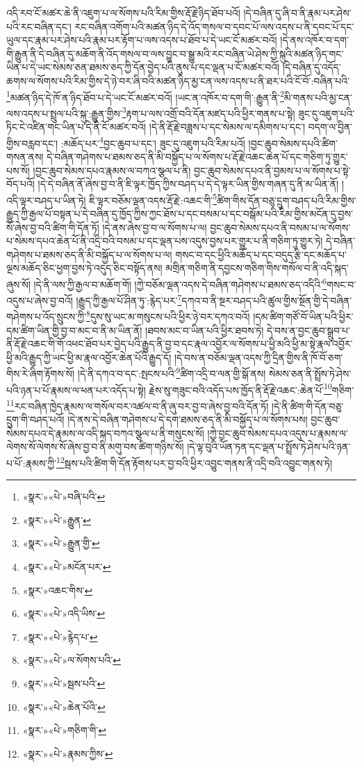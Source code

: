 འདི་རབ་ངོ་མཚར་ཆེ་ནི་འཇུག་པ་ལ་སོགས་པའི་རིམ་གྱིས་རྡོ་རྗེ་ཉིད་ཐོབ་པའོ། །དེ་བཞིན་དུ་ཞི་བ་ནི་རྣམ་པར་ཤེས་པའི་རང་བཞིན་དང་། རང་བཞིན་འགོག་པའི་མཚན་ཉིད་དེ་འོད་གསལ་བ་དབང་པོ་ལས་འདས་པ་ནི་དབང་པོ་དང་ཡུལ་དང་རྣམ་པར་ཤེས་པའི་རྣམ་པར་རྟོག་པ་ལས་འདས་པ་ཐོབ་པ་དེ་ཡང་ངོ་མཚར་བའོ། །དེ་ནས་འཁོར་བ་དག་གི་རྒྱུན་ནི་དེ་བཞིན་དུ་མཆོག་ནི་འོད་གསལ་བ་ལས་བྱུང་བ་སྒྱུ་མའི་རང་བཞིན་ཡེ་ཤེས་ཀྱི་སྐུའི་མཚན་ཉིད་གང་ཡིན་པ་དེ་ཡང་སེམས་ཅན་ཐམས་ཅད་ཀྱི་དོན་བྱེད་པའི་ནུས་པ་དང་ལྡན་པ་ངོ་མཚར་བའོ། །དེ་བཞིན་དུ་འདོད་ཆགས་ལ་སོགས་པའི་རིམ་གྱིས་དེ་ཉེ་བར་ཞི་བའི་མཚན་ཉིད་མྱ་ངན་ལས་འདས་པ་ནི་ཐར་པའི་ངོ་བོ་:བཞིན་པའི་\footnote{«སྣར་»«པེ་»བཞི་པའི་}མཚན་ཉིད་དེ་ཁོ་ན་ཉིད་ཐོབ་པ་དེ་ཡང་ངོ་མཚར་བའོ། །ཡང་ན་འཁོར་བ་དག་གི་:རྒྱུན་ནི་\footnote{«སྣར་»«པེ་»རྒྱུན་}མི་གནས་པའི་མྱ་ངན་ལས་འདས་པ་སྤྲུལ་པའི་སྐུ་:རྒྱུན་གྱིས་\footnote{«སྣར་»«པེ་»རྒྱུན་གྱི་}རྟག་པ་ལས་འགྲོ་བའི་དོན་མཛད་པའི་ཕྱིར་གནས་པ་སྟེ། ཟུང་དུ་འཇུག་པའི་ཏིང་ངེ་འཛིན་གང་ཡིན་པ་དེ་ནི་ངོ་མཚར་བའོ། །དེ་ནི་རྡོ་རྗེ་བཟླས་པ་དང་སེམས་ལ་དམིགས་པ་དང་། བདག་ལ་བྱིན་གྱིས་བརླབ་དང་། :མཆོད་པར་\footnote{«སྣར་»«པེ་»མངོན་པར་}བྱང་ཆུབ་པ་དང་། ཟུང་དུ་འཇུག་པའི་རིམ་པའོ། །བྱང་ཆུབ་སེམས་དཔའི་ཚིག་གསན་ནས། དེ་བཞིན་གཤེགས་པ་ཐམས་ཅད་ནི་མི་བསྐྱོད་པ་ལ་སོགས་པ་རྡོ་རྗེ་འཆང་ཆེན་པོ་དང་གཅིག་ཏུ་གྱུར་པས་སོ། །བྱང་ཆུབ་སེམས་དཔའ་རྣམས་ལ་བཀའ་སྩལ་པ་ནི། བྱང་ཆུབ་སེམས་དཔའ་ནི་བྱམས་པ་ལ་སོགས་པ་སྟེ་བོད་པའོ། །དེ་དེ་བཞིན་ནོ་ཞེས་བྱ་བ་ནི་ཇི་ལྟར་ཁྱོད་ཀྱིས་བཤད་པ་དེ་དེ་ལྟར་ཡིན་གྱིས་གཞན་དུ་ནི་མ་ཡིན་ནོ། །འདི་ལྟར་བཤད་པ་ཡིན་ཏེ། ཇི་ལྟར་བཅོམ་ལྡན་འདས་རྡོ་རྗེ་:འཆང་གི་\footnote{«སྣར་»འཆང་གིས་}ཚིག་གིས་དོན་བཅུ་དྲུག་བཤད་པའི་རིམ་གྱིས་རྒྱུད་ཀྱི་རྒྱལ་པོ་བསྟན་པ་དེ་བཞིན་དུ་ཁྱོད་ཀྱིས་ཀྱང་ཐོས་པ་དང་བསམ་པ་དང་བསྒོམ་པའི་རིམ་གྱིས་མངོན་དུ་བྱས་སོ་ཞེས་བྱ་བའི་ཚིག་གི་དོན་ཏོ། །དེ་ནས་ཞེས་བྱ་བ་ལ་སོགས་པ་ལ། བྱང་ཆུབ་སེམས་དཔའ་ནི་བསམ་པ་ལ་སོགས་པ་སེམས་དཔའ་ཆེན་པོ་ནི་འདྲི་བའི་བསམ་པ་དང་ལྡན་པས་འདུས་བྱས་པར་གྱུར་པ་ནི་གཅིག་ཏུ་གྱུར་ཏེ། དེ་བཞིན་གཤེགས་པ་ཐམས་ཅད་ནི་མི་བསྐྱོད་པ་ལ་སོགས་པ་ལ། གསང་བ་དང་ཕྱིའི་མཆོད་པ་དང་བདུད་རྩི་དང་མཆོད་པ་ལྔས་མཆོད་ཅིང་ཕྱག་བྱས་ཏེ་འདུད་ཅིང་བསྟོད་ནས། མགྲིན་གཅིག་ནི་དབྱངས་གཅིག་གིས་གསོལ་བ་ནི་འདི་སྐད་ཞུས་སོ། །དེ་ནི་ལས་ཀྱི་རྒྱལ་བ་མཆོག་གོ། །ཀྱེ་བཅོམ་ལྡན་འདས་དེ་བཞིན་གཤེགས་པ་ཐམས་ཅད་འདིའི་\footnote{«སྣར་»«པེ་»འདི་ཡིས་}གསང་བ་འདུས་པ་ཞེས་བྱ་བའོ། །རྒྱུད་ཀྱི་རྒྱལ་པོ་ཤིན་ཏུ་:རྙེད་པར་\footnote{«སྣར་»«པེ་»རྙེད་པ་}དཀའ་བ་ནི་སྔར་བཤད་པའི་ཚུལ་གྱིས་སྔོན་གྱི་དེ་བཞིན་གཤེགས་པ་འོད་སྲུངས་ཀྱི་\footnote{«སྣར་»«པེ་»ལ་སོགས་པའི་}དུས་སུ་ཡང་མ་གསུངས་པའི་ཕྱིར་ཉེ་བར་དཀའ་བའོ། །དམ་ཚིག་གཙོ་བོ་ཡིན་པའི་ཕྱིར་དམ་ཚིག་ཡིན་གྱི་བྱ་བ་མང་བ་ནི་མ་ཡིན་ནོ། །ཐབས་མང་བ་ཡིན་པའི་ཕྱིར་ཐབས་ཏེ། དེ་བས་ན་བྱང་ཆུབ་སྒྲུབ་པ་ནི་རྡོ་རྗེ་འཆང་གི་གོ་འཕང་ཐོབ་པར་བྱེད་པའི་རྒྱུད་ནི་བྱ་བ་དང་རྣལ་འབྱོར་ལ་སོགས་པ་ཕྱི་མའི་ཕྱི་མ་སྟེ་རྣལ་འབྱོར་ཕྱི་མའི་རྒྱུད་ཀྱི་ཡང་ཕྱི་མ་རྣལ་འབྱོར་ཆེན་པོའི་རྒྱུད་དོ། །དེ་བས་ན་བཅོམ་ལྡན་འདས་ཀྱི་དྲིན་གྱིས་ནི་ཁོ་བོ་ཅག་གིས་རེ་ཞིག་རྟོགས་སོ། །དེ་ནི་དཀའ་བ་དང་:སྤངས་པའི་\footnote{«སྣར་»«པེ་»སྦས་པའི་}ཚིག་འདྲི་བ་ལན་གྱི་སྒོ་ནས། སེམས་ཅན་ནི་སྤྲོས་ཏེ་ཤེས་པའི་ཉན་པ་པོ་རྣམས་ལ་ཕན་པར་འདོད་པ་སྟེ། རྗེས་སུ་གཟུང་བའི་འདོད་པས་ཁྱོད་ནི་རྡོ་རྗེ་འཆང་:ཆེན་པོ་\footnote{«སྣར་»«པེ་»ཆེན་པོའི་}གཅིག་\footnote{«སྣར་»«པེ་»གཅིག་གི་}རང་བཞིན་ཁྱེད་རྣམས་ལ་གསོལ་བར་འཚལ་བ་ནི་ཞུ་བར་བྱ་བ་ཞེས་བྱ་བའི་དོན་ཏོ། །དེ་ནི་ཚིག་གི་དོན་བཅུ་དྲུག་གི་བཤད་པའོ། །དེ་ནས་དེ་བཞིན་གཤེགས་པ་དེ་དག་ཐམས་ཅད་ནི་མི་བསྐྱོད་པ་ལ་སོགས་པས། བྱང་ཆུབ་སེམས་དཔའ་དེ་རྣམས་ལ་འདི་སྐད་བཀའ་སྩལ་པ་ནི་གསུངས་སོ། །ཀྱེ་བྱང་ཆུབ་སེམས་དཔའ་འདུས་པ་རྣམས་ལ་ལེགས་སོ་ལེགས་སོ་ཞེས་བྱ་བ་ནི་མགུ་བས་ཚིག་གཉིས་སོ། །དེ་ལྟ་བུའི་ཡོན་ཏན་དང་ལྡན་པ་སྤྲོས་ཏེ་ཤེས་པའི་ཉན་པ་པོ་:རྣམས་ཀྱི་\footnote{«སྣར་»«པེ་»རྣམས་ཀྱིས་}སྦས་པའི་ཚིག་གི་དོན་རྟོགས་པར་བྱ་བའི་ཕྱིར་འབྱུང་གནས་ནི་འདྲི་བའི་འབྱུང་གནས་ཏེ། 